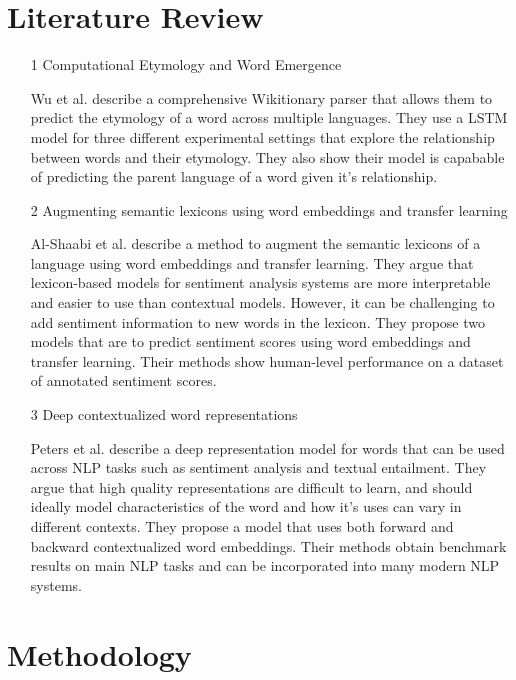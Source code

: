 \documentclass[a4paper,12pt]{article}
\begin{document}
\section{Literature Review}
\begin{itemize}
    \item[1] Computational Etymology and Word Emergence
        \cite{wu_computational_2020}

        Wu et al. describe a comprehensive Wikitionary parser that allows them
        to predict the etymology of a word across multiple languages. They use a
        LSTM model for three different experimental settings that explore the
        relationship between words and their etymology. They also show their
        model is capabable of predicting the parent language of a word given
        it's relationship.

    \item[2] Augmenting semantic lexicons using word embeddings and transfer
        learning \cite{alshaabi_augmenting_2021}

        Al-Shaabi et al. describe a method to augment the semantic lexicons of a
        language using word embeddings and transfer learning. They argue that
        lexicon-based models for sentiment analysis systems are more
        interpretable and easier to use than contextual models. However, it can
        be challenging to add sentiment information to new words in the lexicon.
        They propose two models that are to predict sentiment scores using word
        embeddings and transfer learning. Their methods show human-level
        performance on a dataset of annotated sentiment scores.

    \item[3] Deep contextualized word representations \cite{peters_deep_2018}

        Peters et al. describe a deep representation model for words that can be
        used across NLP tasks such as sentiment analysis and textual entailment.
        They argue that high quality representations are difficult to learn, and
        should ideally model characteristics of the word and how it's uses can
        vary in different contexts. They propose a model that uses both forward
        and backward contextualized word embeddings. Their methods obtain
        benchmark results on main NLP tasks and can be incorporated into many
        modern NLP systems.
\end{itemize}

\section{Methodology}
\end{document}
